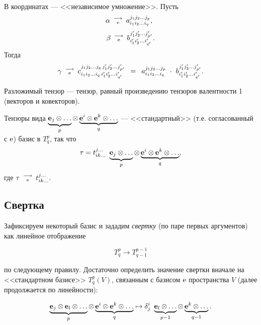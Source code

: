 В координатах --- <<независимое умножение>>. Пусть
$$\alpha \, \, \begin{smallmatrix} \longrightarrow \\ \mathrm{e} \end{smallmatrix} \, \,  
a_{i_1i_2 \ldots i_q}^{j_1j_2\ldots j_p},  \,\,\, $$
$$\beta \, \, \begin{smallmatrix} \longrightarrow \\ \mathrm{e} \end{smallmatrix} \, \,  
b_{i'_1i'_2 \ldots i'_{q'}}^{j'_1j'_2\ldots j'_{p'}}. $$
Тогда 
$$\gamma \, \, \begin{smallmatrix} \longrightarrow \\ \mathrm{e} \end{smallmatrix} \, \,  
c_{i_1i_2 \ldots i_q\,  i'_1i'_2 \ldots i'_{q'}}^{j_1j_2\ldots j_p\, j'_1j'_2\ldots j'_{p'}} \,\,\, =
\,\,\, a_{i_1i_2 \ldots i_q}^{j_1j_2\ldots j_p}\,\, \cdot \,\, 
b_{i'_1i'_2 \ldots i'_{q'}}^{j'_1j'_2\ldots j'_{p'}}. $$

Разложимый тензор --- тензор, равный произведению тензоров валентности 1 (векторов и ковекторов).


\otstup

Тензоры вида  $\underbrace{\mathbf{e}_j \otimes \ldots }_p\otimes 
\underbrace{\mathbf{e}^i \otimes \mathbf{e}^k \otimes \ldots }_q$
--- <<стандартный>> (т.е. согласованный с $\mathrm{e}$) базис в $T^p_q$,
так что 
$$\tau  = t^{j\ldots}_{ik\ldots } \,\,
\underbrace{\mathbf{e}_j \otimes \ldots }_p\otimes 
\underbrace{\mathbf{e}^i \otimes \mathbf{e}^k \otimes \ldots }_q, $$
где 
$\tau \, \, \begin{smallmatrix} \longrightarrow \\ \mathrm{e} \end{smallmatrix} \, \,  
t_{ik \ldots }^{j\ldots }.  $



\subsection{Свертка}

Зафиксируем некоторый базис и зададим {\it свертку }  (по паре первых аргументов) как линейное отображение 

$$T^p_q\to T^{p-1}_{q-1}$$

по следующему правилу. Достаточно определить значение свертки вначале на 
<<стандартном базисе>> $T^p_q(V)$, связанным с базисом $\mathrm{e}$ пространства $V$
(далее продолжается по линейности):

\begin{equation}\label{svert}
\underbrace{\mathbf{e}_j \otimes \mathbf{e}_l \otimes \ldots }_p\otimes 
\underbrace{\mathbf{e}^i \otimes \mathbf{e}^k \otimes \ldots }_q
\mapsto \delta_j^i  \, \, \underbrace{\mathbf{e}_l \otimes \ldots }_{p-1}\otimes 
\underbrace{\mathbf{e}^k \otimes \ldots}_{q-1}.
\end{equation}


